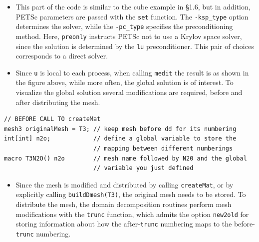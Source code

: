 \documentclass[9pt]{amsart}
\theoremstyle{remark}
\theoremstyle{definition}
\begin{document}
\begin{itemize}
\item This part of the code is similar to the cube example in \S1.6, but in addition, PETSc parameters are passed with the \verb!set! function. The \verb!-ksp_type! option determines the solver, while the \verb!-pc_type! specifies the preconditioning method. Here, \verb!preonly! instructs PETSc not to use a Krylov space solver, since the solution is determined by the \verb!lu! preconditioner. This pair of choices corresponds to a direct solver.
\item Since \verb!u! is local to each process, when calling \verb!medit! the result is as shown in the figure above, while more often, the global solution is of interest. To visualize the global solution several modifications are required, before and after distributing the mesh.
\end{itemize}

\begin{Verbatim}[commandchars=\\\{\}]
// BEFORE CALL TO createMat
mesh3 originalMesh = T3; // keep mesh before dd for its numbering
int[int] n2o;            // define a global variable to store the 
                         // mapping between different numberings
macro T3N2O() n2o        // mesh name followed by N20 and the global 
                         // variable you just defined
\end{Verbatim}

\begin{itemize}
\item Since the mesh is modified and distributed by calling \verb!createMat!, or by explicitly calling \verb!buildDmesh(T3)!, the original mesh needs to be stored. To distribute the mesh, the domain decomposition routines perform mesh modifications with the \verb!trunc! function, which admits the option \verb!new2old! for storing  information about how the after-\verb!trunc! numbering maps to the before-\verb!trunc! numbering.
\end{itemize}
\end{document}
